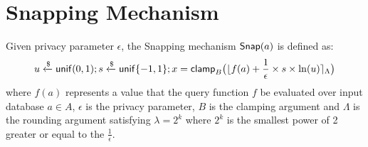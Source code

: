 \documentclass[a4paper,11pt]{article}
\begin{document}
\newpage
\section{Snapping Mechanism}

\begin{defn}
Given privacy parameter $\epsilon$, the Snapping mechanism $\mathsf{Snap}(a)$ is defined as:
\[
	u \xleftarrow{\$} \mathsf{unif}(0,1); s \xleftarrow{\$} \mathsf{unif}\{-1, 1\};
	x = \mathsf{clamp}_B \big(
	\lfloor f(a) + \frac{1}{\epsilon} \times s \times \ln (u) \rceil_{\Lambda}
	\big)
\]
where $f(a)$ represents a value that the query function $f$ be evaluated over input database $a \in A$, $\epsilon$ is the privacy parameter, $B$ is the clamping argument and $\Lambda$ is the rounding argument satisfying $\lambda = 2^k$ where $2^k$ is the smallest power of 2 greater or equal to the $\frac{1}{\epsilon}$.
\end{defn}
\end{document}
